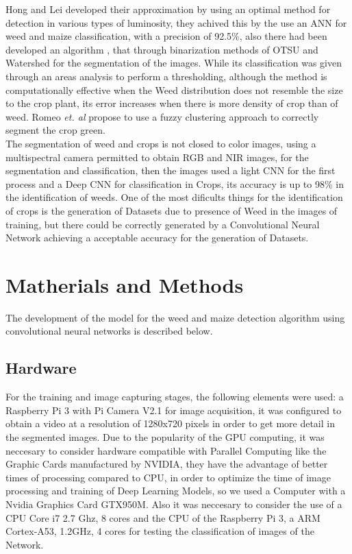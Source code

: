 \documentclass[conference]{IEEEtran}
\begin{document}
Hong and Lei \cite{jeon2011robust} developed their approximation by using an optimal method for detection in various types of luminosity, they achived this by the use an ANN for weed and maize classification, with a precision of 92.5\%,  also there had been developed an algorithm \cite{hlaing2014weed}, that through binarization methods of OTSU and Watershed for the segmentation of the images. While its classification was given through an areas analysis to perform a thresholding, although the method is computationally effective when the Weed distribution does not resemble the size to the crop plant, its error increases when there is more density of crop than of weed. Romeo \textit{et. al} \cite{romeo2012crop} propose to use a fuzzy clustering approach to correctly segment the crop green.
\\

The segmentation of weed and crops is not closed to color images, using a multispectral camera  \cite{potena2016fast} permitted to obtain RGB and NIR images, for the segmentation and classification, then the images used a light CNN for the first process and a Deep CNN for classification in Crops, its accuracy is up to 98\% in the identification of weeds. One of the most dificults things for the identification of crops is the generation of Datasets due to presence of Weed in the images of training, but there could be correctly generated by a Convolutional Neural Network \cite{di2016automatic} achieving a acceptable accuracy for the generation of Datasets. 
\\

\section{Matherials and Methods}
The development of the model for the weed and maize detection algorithm using convolutional neural networks is described below.
\\
\subsection{Hardware}
For the training and image capturing stages, the following elements were used: a Raspberry Pi 3 with Pi Camera V2.1 for image acquisition, it was configured to obtain a video at a resolution of 1280x720 pixels in order to get more detail in the segmented images. Due to the popularity of the GPU computing, it was neccesary to consider hardware compatible with Parallel Computing like the Graphic Cards manufactured by NVIDIA, they have the advantage of better times of processing compared to CPU, in order to optimize the time of image processing and training of Deep Learning Models, so we used a Computer with a Nvidia Graphics Card GTX950M. Also it was neccesary to consider the use of a CPU Core i7 2.7 Ghz, 8 cores and the CPU of the Raspberry Pi 3, a ARM Cortex-A53, 1.2GHz, 4 cores for testing the classification of images of the Network.   
\\
\end{document}
